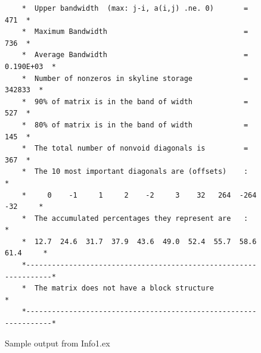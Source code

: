 \documentclass[12pt]{article}
\begin{document}
\begin{figure}
\begin{verbatim}
    *  Upper bandwidth  (max: j-i, a(i,j) .ne. 0)       =        471  *
    *  Maximum Bandwidth                                =        736  *
    *  Average Bandwidth                                =  0.190E+03  *
    *  Number of nonzeros in skyline storage            =     342833  *
    *  90% of matrix is in the band of width            =        527  *
    *  80% of matrix is in the band of width            =        145  *
    *  The total number of nonvoid diagonals is         =        367  *
    *  The 10 most important diagonals are (offsets)    :             *
    *     0    -1     1     2    -2     3    32   264  -264   -32     *
    *  The accumulated percentages they represent are   :             *
    *  12.7  24.6  31.7  37.9  43.6  49.0  52.4  55.7  58.6  61.4     *
    *-----------------------------------------------------------------*
    *  The matrix does not have a block structure                     *
    *-----------------------------------------------------------------*
\end{verbatim}
\caption{Sample output from Info1.ex \label{Fig1} } 
\end{figure}
\end{document}
